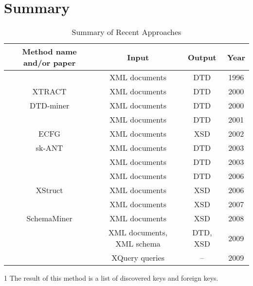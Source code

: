 \section{Summary}
\begin{table}
  \begin{threeparttable}
  \footnotesize \begin{tabular}{|c|c|c|c|}
    \hline
    Method name and/or paper & Input & Output & Year \\ \hline \hline
    \cite{Ahonen1996GeneratingGrammars} & XML documents & DTD & 1996 \\ \hline
    XTRACT \cite{Garofalakis:2000:XSE:342009.335409} & XML documents & DTD & 2000 \\ \hline
    DTD-miner \cite{Moh:2000:RSW:336597.336638} & XML documents & DTD & 2000 \\ \hline
    \cite{Fernau:2001:LXG:645744.667236} & XML documents & DTD & 2001 \\ \hline
    ECFG \cite{Chidlovskii:2002:SEX:544220.544288} & XML documents & XSD & 2002 \\ \hline
    sk-ANT \cite{Wong03onstructural} & XML documents & DTD & 2003 \\ \hline
    \cite {Min:2003:EES:639473.639475} & XML documents & DTD & 2003 \\ \hline
    \cite{Bex:2006:ICD:1182635.1164139} & XML documents & DTD & 2006 \\ \hline
    XStruct \cite {Hegewald:2006:XES:1129755.1130124} & XML documents & XSD & 2006 \\ \hline
    \cite{Bex:2007:IXS:1325851.1325964} & XML documents & XSD & 2007 \\ \hline
    SchemaMiner \cite{Vosta:2008:EAC:1802514.1802522} & XML documents & XSD & 2008 \\ \hline
    \cite{Mlynkova:2009:IXS:1862681.1862693} & XML documents, XML schema & DTD, XSD & 2009 \\ \hline
    \cite{Necasky:2009:DXK:1529282.1529414} & XQuery queries & --\tnote{1} & 2009 \\ \hline    
  \end{tabular}
  \begin{tablenotes}
	\item [1] The result of this method is a list of discovered keys and foreign keys.
  \end{tablenotes}
  \caption{Summary of Recent Approaches}
  \label{table_summary_of_recent_approaches}
  \end{threeparttable}
\end{table}

